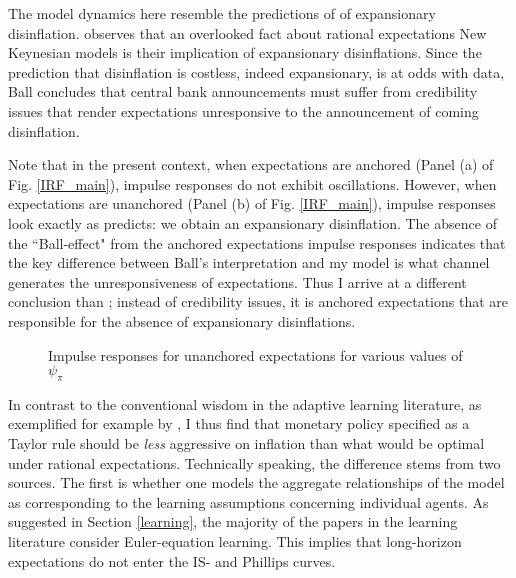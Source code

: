 \documentclass[11pt]{article}
\def \myFigPath {../../figures/}
\renewcommand{\[}{\begin{equation}}
\renewcommand{\]}{\end{equation}}
\def\fignameIRFpsipiSmall{RIR_unanch_psi_pi1_01_command_IRFs_approx_pretty_2020_09_17}
\def\fignameIRFpsipiMedium{RIR_unanch_psi_pi1_5_command_IRFs_approx_pretty_2020_09_17}
\def\fignameIRFpsipiBig{RIR_unanch_psi_pi2_command_IRFs_approx_pretty_2020_09_17}
\begin{document}
The model dynamics here resemble the predictions of \cite{ball1994credible} of expansionary disinflation. \cite{ball1994credible} observes that an overlooked fact about rational expectations New Keynesian models is their implication of expansionary disinflations. Since the prediction that disinflation is costless, indeed expansionary, is at odds with data, Ball concludes that central bank announcements must suffer from credibility issues that render expectations unresponsive to the announcement of coming disinflation.

Note that in the present context, when expectations are anchored (Panel (a) of Fig. \ref{IRF_main}), impulse responses do not exhibit oscillations. However, when expectations are unanchored (Panel (b) of Fig. \ref{IRF_main}), impulse responses look exactly as \cite{ball1994credible} predicts: we obtain an expansionary disinflation. The absence of the ``Ball-effect" from the anchored expectations impulse responses indicates that the key difference between Ball's interpretation and my model is what channel generates the unresponsiveness of expectations. Thus I arrive at a different conclusion than \cite{ball1994credible}; instead of credibility issues, it is anchored expectations that are responsible for the absence of expansionary disinflations.

\begin{figure}[h!]
\caption{Impulse responses for unanchored expectations for various values of $\psi_{\pi}$}
\label{IRF_unanchored_psi_main}
\end{figure}


In contrast to the conventional wisdom in the adaptive learning literature, as exemplified for example by \cite{orphanides2004imperfect}, I thus find that monetary policy specified as a Taylor rule should be \emph{less} aggressive on inflation than what would be optimal under rational expectations. Technically speaking, the difference stems from two sources. The first is whether one models the aggregate relationships of the model as corresponding to the learning assumptions concerning individual agents. As suggested in Section \ref{learning}, the majority of the papers in the learning literature consider Euler-equation learning. This implies that long-horizon expectations do not enter the IS- and Phillips curves. 
\end{document}
